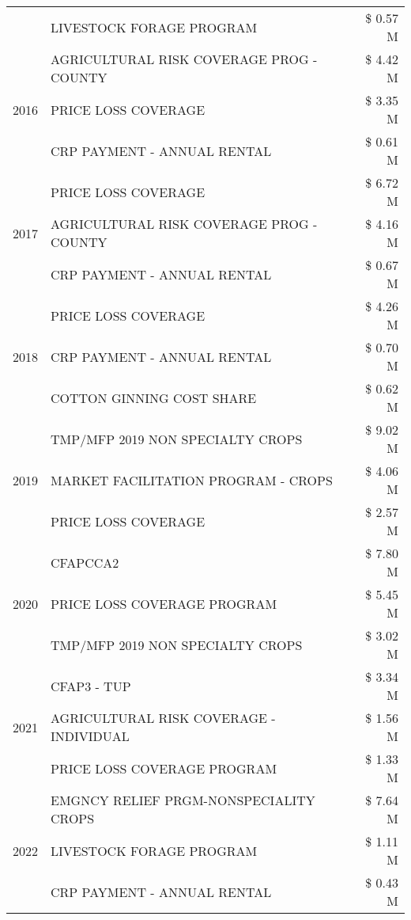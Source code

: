 \begin{tabular}{llr}
 & LIVESTOCK FORAGE PROGRAM & \$ 0.57 M \\
\cline{1-3}
\multirow[t]{3}{*}{2016} & AGRICULTURAL RISK COVERAGE PROG - COUNTY & \$ 4.42 M \\
 & PRICE LOSS COVERAGE & \$ 3.35 M \\
 & CRP PAYMENT - ANNUAL RENTAL & \$ 0.61 M \\
\cline{1-3}
\multirow[t]{3}{*}{2017} & PRICE LOSS COVERAGE & \$ 6.72 M \\
 & AGRICULTURAL RISK COVERAGE PROG - COUNTY & \$ 4.16 M \\
 & CRP PAYMENT - ANNUAL RENTAL & \$ 0.67 M \\
\cline{1-3}
\multirow[t]{3}{*}{2018} & PRICE LOSS COVERAGE & \$ 4.26 M \\
 & CRP PAYMENT - ANNUAL RENTAL & \$ 0.70 M \\
 & COTTON GINNING COST SHARE & \$ 0.62 M \\
\cline{1-3}
\multirow[t]{3}{*}{2019} & TMP/MFP 2019 NON SPECIALTY CROPS & \$ 9.02 M \\
 & MARKET FACILITATION PROGRAM - CROPS & \$ 4.06 M \\
 & PRICE LOSS COVERAGE & \$ 2.57 M \\
\cline{1-3}
\multirow[t]{3}{*}{2020} & CFAPCCA2 & \$ 7.80 M \\
 & PRICE LOSS COVERAGE PROGRAM & \$ 5.45 M \\
 & TMP/MFP 2019 NON SPECIALTY CROPS & \$ 3.02 M \\
\cline{1-3}
\multirow[t]{3}{*}{2021} & CFAP3 - TUP & \$ 3.34 M \\
 & AGRICULTURAL RISK COVERAGE - INDIVIDUAL & \$ 1.56 M \\
 & PRICE LOSS COVERAGE PROGRAM & \$ 1.33 M \\
\cline{1-3}
\multirow[t]{3}{*}{2022} & EMGNCY RELIEF PRGM-NONSPECIALITY CROPS & \$ 7.64 M \\
 & LIVESTOCK FORAGE PROGRAM & \$ 1.11 M \\
 & CRP PAYMENT - ANNUAL RENTAL & \$ 0.43 M \\
\cline{1-3}
\bottomrule
\end{tabular}
